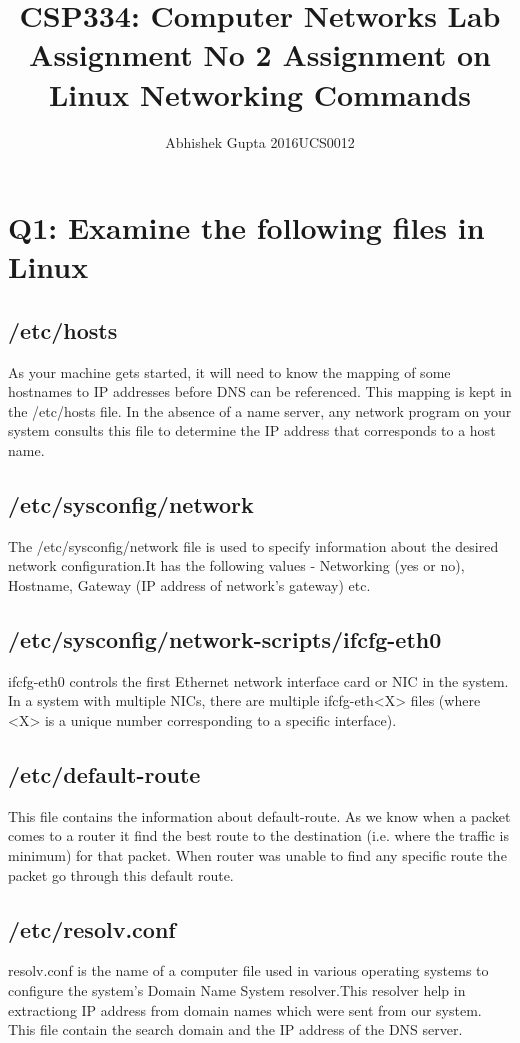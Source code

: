 \documentclass{article}
\title{CSP334: Computer Networks \linebreak
Lab Assignment No 2 \linebreak
Assignment on Linux Networking Commands}
\author{Abhishek Gupta  2016UCS0012}
\begin{document}
\maketitle


\section{Q1: Examine the following files in Linux}

\subsection{/etc/hosts}
As your machine gets started, it will need to know the mapping of some hostnames to IP addresses before DNS can be referenced. This mapping is kept in the /etc/hosts file. In the absence of a name server, any network program on your system consults this file to determine the IP address that corresponds to a host name.
\subsection{/etc/sysconfig/network}
The /etc/sysconfig/network file is used to specify information about the desired network configuration.It has the following values - Networking (yes or
no), Hostname, Gateway (IP address of network’s gateway) etc.
\subsection{/etc/sysconfig/network-scripts/ifcfg-eth0}
ifcfg-eth0  controls the first Ethernet network interface card or NIC in the system. In a system with multiple NICs, there are multiple ifcfg-eth<X> files (where <X> is a unique number corresponding to a specific interface).
\subsection{/etc/default-route}
This file contains the information about default-route. As we know
when a packet comes to a router it find the best route to the destination
(i.e. where the traffic is minimum) for that packet. When router was
unable to find any specific route the packet go through this default
route.
\subsection{/etc/resolv.conf}
resolv.conf is the name of a computer file used in various operating systems to configure the system's Domain Name System resolver.This resolver help in extractiong IP address from domain names which were sent from our system. This file
contain the search domain and the IP address of the DNS server.
\end{document}
